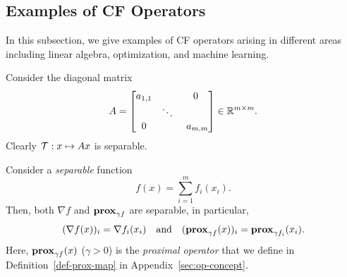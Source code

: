 \subsection{Examples of CF Operators}\label{sec:exp-cuf}
In this subsection, we give  examples of CF operators arising in different areas including linear algebra, optimization, and machine learning.
\begin{example}\label{exp:diagmat}
Consider the diagonal matrix
$$A = \begin{bmatrix}a_{1,1} & ~ & 0 \\  & \ddots&  \\ 0& ~& ~a_{m,m}\end{bmatrix}\in\RR^{m\times m}.$$
Clearly ${\mathcal{T}}:x\mapsto Ax$ is separable.
\end{example}
\begin{example}
Consider a \emph{separable} function
$$f(x) = \sum_{i=1}^m f_i(x_i).$$
Then, both $\nabla f$ and $\mathbf{prox}_{\gamma f}$ are separable, in particular,
$$(\nabla f(x))_i = \nabla f_i (x_i) \quad \mbox{and}\quad (\mathbf{prox}_{\gamma f}(x))_i= \mathbf{prox}_{\gamma f_i} (x_i).$$
Here, $\mathbf{prox}_{\gamma f} (x)$ ($\gamma >0$) is the \emph{proximal operator} that we  define in Definition~\ref{def-prox-map} in Appendix~\ref{sec:op-concept}. %
\end{example}

